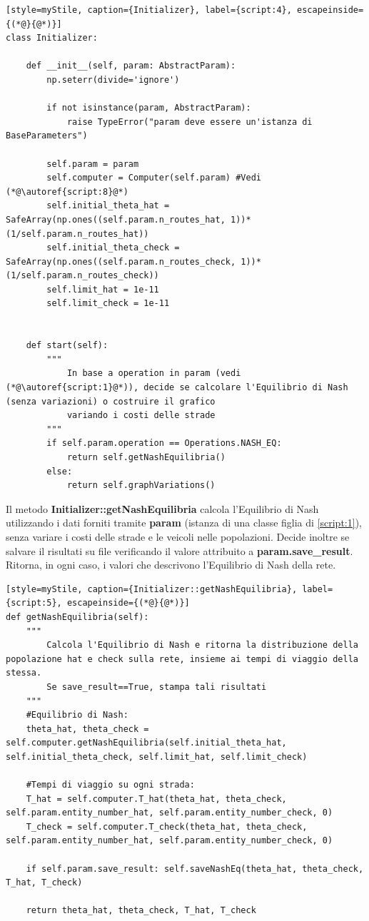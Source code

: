 \begin{lstlisting}[style=myStile, caption={Initializer}, label={script:4}, escapeinside={(*@}{@*)}]
class Initializer:
    
    def __init__(self, param: AbstractParam):
        np.seterr(divide='ignore')
        
        if not isinstance(param, AbstractParam):
            raise TypeError("param deve essere un'istanza di BaseParameters")
        
        self.param = param
        self.computer = Computer(self.param) #Vedi (*@\autoref{script:8}@*)
        self.initial_theta_hat = SafeArray(np.ones((self.param.n_routes_hat, 1))*(1/self.param.n_routes_hat))
        self.initial_theta_check = SafeArray(np.ones((self.param.n_routes_check, 1))*(1/self.param.n_routes_check))
        self.limit_hat = 1e-11
        self.limit_check = 1e-11
        
        
    def start(self):
        """
            In base a operation in param (vedi (*@\autoref{script:1}@*)), decide se calcolare l'Equilibrio di Nash (senza variazioni) o costruire il grafico
            variando i costi delle strade
        """
        if self.param.operation == Operations.NASH_EQ:
            return self.getNashEquilibria()
        else:
            return self.graphVariations()
\end{lstlisting}

Il metodo \textbf{Initializer::getNashEquilibria} calcola l'Equilibrio di Nash utilizzando i dati forniti tramite \textbf{param} (istanza di una classe figlia di \autoref{script:1}), senza variare
i costi delle strade e le veicoli nelle popolazioni. Decide inoltre se salvare il risultati su file verificando il valore attribuito a \textbf{param.save\_result}. Ritorna, in ogni
caso, i valori che descrivono l'Equilibrio di Nash della rete.

\begin{lstlisting}[style=myStile, caption={Initializer::getNashEquilibria}, label={script:5}, escapeinside={(*@}{@*)}]
def getNashEquilibria(self):
    """
        Calcola l'Equilibrio di Nash e ritorna la distribuzione della popolazione hat e check sulla rete, insieme ai tempi di viaggio della stessa.
        Se save_result==True, stampa tali risultati
    """     
    #Equilibrio di Nash:
    theta_hat, theta_check = self.computer.getNashEquilibria(self.initial_theta_hat, self.initial_theta_check, self.limit_hat, self.limit_check)
    
    #Tempi di viaggio su ogni strada:
    T_hat = self.computer.T_hat(theta_hat, theta_check, self.param.entity_number_hat, self.param.entity_number_check, 0)
    T_check = self.computer.T_check(theta_hat, theta_check, self.param.entity_number_hat, self.param.entity_number_check, 0)
    
    if self.param.save_result: self.saveNashEq(theta_hat, theta_check, T_hat, T_check)
    
    return theta_hat, theta_check, T_hat, T_check
\end{lstlisting}

